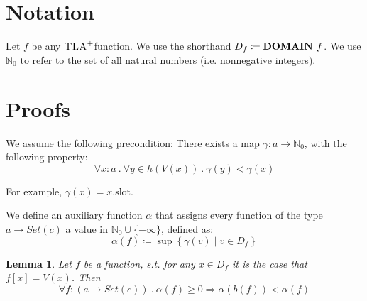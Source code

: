 \documentclass{article}
\newtheorem{lemma}[theorem]{Lemma}
\newcommand{\iteDef}[4]{
  #1 \coloneqq \left\{
\begin{array}{ll}
      #2 &; #3 \\
      #4 &; \text{otherwise}\\
\end{array} 
\right. 
}
\newcommand{\tlap}{$\textsc{TLA}^{+}$}
\newcommand{\nat}{\mathbb N_0}
\newcommand{\op}{\textsc{Op}}
\begin{document}
\section{Notation}
Let $f$ be any \tlap function. We use the shorthand $D_f \coloneqq \text{\bf DOMAIN } f$.
We use $\nat$ to refer to the set of all natural numbers (i.e. nonnegative integers).

\section{Proofs}

We assume the following precondition: There exists a map $\gamma: a \to \nat$, with the following property:
\[
\forall x\colon a \ .\ \forall y \in h(V(x)) \ .\ \gamma(y) < \gamma(x) 
\]

For example, $\gamma(x) = x.\text{slot}$.




We define an auxiliary function $\alpha$ that assigns every function of the type $a \to Set(c)$ a value in $\nat \cup \{-\infty\}$, defined as:
\[
\alpha(f) \coloneqq \sup\left\{ \gamma(v) \mid v \in D_f \right\}
\]

\begin{lemma}\label{lemma2}
Let $f$ be a function, s.t. for any $x \in D_f$ it is the case that $f[x] = V(x)$. Then
\[
\forall f\colon (a \to Set(c)) \ .\ \alpha(f) \ge 0 \Rightarrow \alpha(b(f)) < \alpha(f)
\]
\end{lemma}
\end{document}
